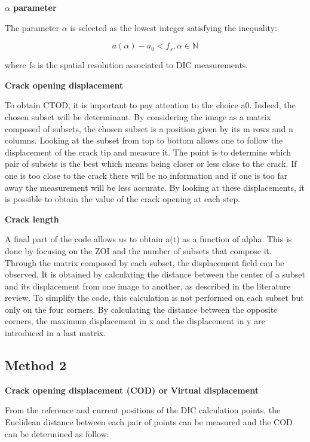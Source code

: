 \textbf{$\alpha$ parameter}

The parameter $\alpha$ is selected as the lowest integer satisfying the inequality:

\begin{equation}
	a(\alpha)-a_0 < f_s, \alpha \in \mathbb{N}
\end{equation}

where fs is the spatial resolution associated to DIC measurements.

\textbf{Crack opening displacement}

To obtain CTOD, it is important to pay attention to the choice a0. Indeed, the chosen subset will be determinant. By considering the image as a matrix composed of subsets, the chosen subset is a position given by its m rows and n columns. Looking at the subset from top to bottom allows one to follow the displacement of the crack tip and measure it. The point is to determine which pair of subsets is the best which means being closer or less close to the crack. If one is too close to the crack there will be no information and if one is too far away the measurement will be less accurate. By looking at these displacements, it is possible to obtain the value of the crack opening at each step.

\textbf{Crack length}

A final part of the code allows us to obtain a(t) as a function of alpha. This is done by focusing on the ZOI and the number of subsets that compose it. Through the matrix composed by each subset, the displacement field can be observed. It is obtained by calculating the distance between the center of a subset and its displacement from one image to another, as described in the literature review. To simplify the code, this calculation is not performed on each subset but only on the four corners. By calculating the distance between the opposite corners, the maximum displacement in x and the displacement in y are introduced in a last matrix.

\subsection{Method 2}

\textbf{Crack opening displacement (COD) or Virtual displacement}

From the reference and current positions of the DIC calculation points, the Euclidean distance between each pair of points can be measured and the COD can be determined as follow:

